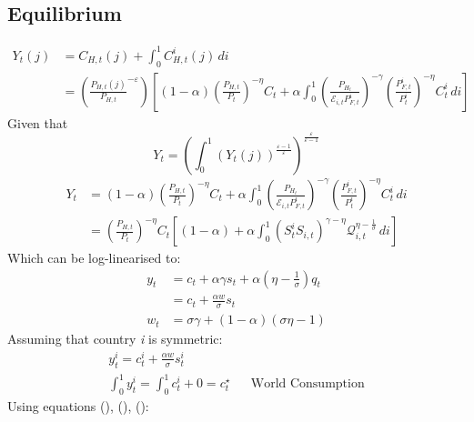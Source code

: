 \subsection{Equilibrium}
\begin{align}
    Y_t(j) & = C_{H,t}(j) + \int_{0}^{1} C_{H,t}^i (j) \, di                                                                                                                                                                                                                                      \\
           & =\left(\frac{P_{H,t}(j)}{P_{H,t}}^{-\varepsilon}\right) \left[ (1-\alpha) \left(\frac{P_{H,t}}{P_t} \right)^{-\eta} C_t + \alpha \int_{0}^{1} \left( \frac{P_{H_t}}{\mathcal{E}_{i,t}P_{F,t}^i}\right)^{-\gamma} \left(\frac{P_{F,t}^i}{P_t^i} \right)^{-\eta} C_{t}^i \, di \right]
\end{align}
Given that
\begin{equation}
    Y_t = \left( \int_{0}^{1} (Y_t(j))^{\frac{\varepsilon-1}{\varepsilon}}\right)^{\frac{\varepsilon}{\varepsilon-1}}
\end{equation}
\begin{align}
    Y_t & = (1-\alpha) \left(\frac{P_{H,t}}{P_t} \right)^{-\eta} C_t + \alpha \int_{0}^{1} \left( \frac{P_{H_t}}{\mathcal{E}_{i,t}P_{F,t}^i}\right)^{-\gamma} \left(\frac{P_{F,t}^i}{P_t^i} \right)^{-\eta} C_{t}^i \, di \\
        & = \left(\frac{P_{H,t}}{P_t}\right)^{-\eta}C_t \left[ (1-\alpha) + \alpha \int_{0}^{1} (S_t^i S_{i,t})^{\gamma - \eta} \mathcal{Q}_{i,t}^{\eta - \frac{1}{\sigma}} \, di \right]
\end{align}
Which can be log-linearised to:
\begin{align}
    y_t & = c_t + \alpha \gamma s_t + \alpha(\eta - \frac{1}{\sigma})q_t \\
        & = c_t + \frac{\alpha w}{\sigma}s_t                             \\
    w_t & = \sigma \gamma + (1-\alpha)(\sigma \eta - 1)
\end{align}
Assuming that country \textit{i} is symmetric:
\begin{align}
    y_t^i = c_t^i + \frac{\alpha w}{\sigma} s_t^i            &  &                          \\
    \int_{0}^{1} y_t^i = \int_{0}^{1} c_t^i + 0 =c_t^{\star} &  & \text{World Consumption}
\end{align}
Using equations (), (), ():
